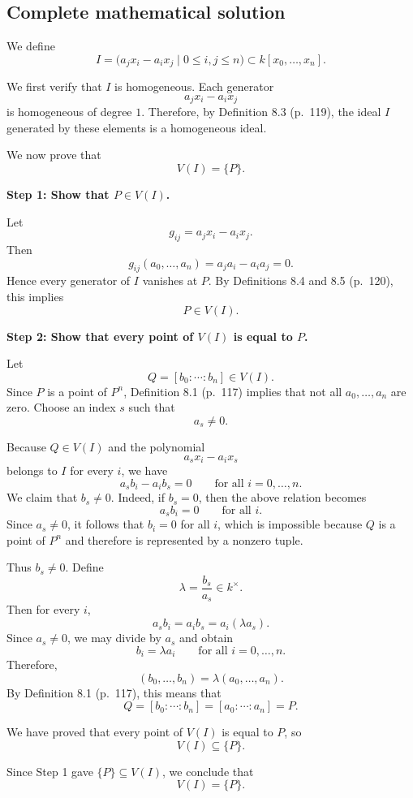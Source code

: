 \documentclass[a4paper,12pt,openany]{article}
\theoremstyle{plain}
\theoremstyle{definition}
\theoremstyle{remark}
\begin{document}
\subsection*{Complete mathematical solution}

We define
\[
I=\bigl(a_jx_i-a_ix_j \mid 0\le i,j\le n\bigr)\subset k[x_0,\dots,x_n].
\]

We first verify that $I$ is homogeneous. Each generator
\[
a_jx_i-a_ix_j
\]
is homogeneous of degree $1$. Therefore, by Definition 8.3 (p.~119), the ideal $I$
generated by these elements is a homogeneous ideal.

We now prove that
\[
V(I)=\{P\}.
\]

\medskip

\noindent\textbf{Step 1: Show that $P\in V(I)$.}

Let
\[
g_{ij}=a_jx_i-a_ix_j.
\]
Then
\[
g_{ij}(a_0,\dots,a_n)=a_ja_i-a_ia_j=0.
\]
Hence every generator of $I$ vanishes at $P$. By Definitions 8.4 and 8.5 (p.~120),
this implies
\[
P\in V(I).
\]

\medskip

\noindent\textbf{Step 2: Show that every point of $V(I)$ is equal to $P$.}

Let
\[
Q=[b_0:\cdots:b_n]\in V(I).
\]
Since $P$ is a point of $P^n$, Definition 8.1 (p.~117) implies that not all
$a_0,\dots,a_n$ are zero. Choose an index $s$ such that
\[
a_s\neq 0.
\]

Because $Q\in V(I)$ and the polynomial
\[
a_sx_i-a_ix_s
\]
belongs to $I$ for every $i$, we have
\[
a_sb_i-a_ib_s=0
\qquad\text{for all } i=0,\dots,n.
\]
We claim that $b_s\neq 0$. Indeed, if $b_s=0$, then the above relation becomes
\[
a_sb_i=0
\qquad\text{for all } i.
\]
Since $a_s\neq 0$, it follows that $b_i=0$ for all $i$, which is impossible because
$Q$ is a point of $P^n$ and therefore is represented by a nonzero tuple.

Thus $b_s\neq 0$. Define
\[
\lambda=\frac{b_s}{a_s}\in k^\times.
\]
Then for every $i$,
\[
a_sb_i=a_ib_s=a_i(\lambda a_s).
\]
Since $a_s\neq 0$, we may divide by $a_s$ and obtain
\[
b_i=\lambda a_i
\qquad\text{for all } i=0,\dots,n.
\]
Therefore,
\[
(b_0,\dots,b_n)=\lambda(a_0,\dots,a_n).
\]
By Definition 8.1 (p.~117), this means that
\[
Q=[b_0:\cdots:b_n]=[a_0:\cdots:a_n]=P.
\]

We have proved that every point of $V(I)$ is equal to $P$, so
\[
V(I)\subseteq \{P\}.
\]

Since Step 1 gave $\{P\}\subseteq V(I)$, we conclude that
\[
V(I)=\{P\}.
\]
\end{document}
